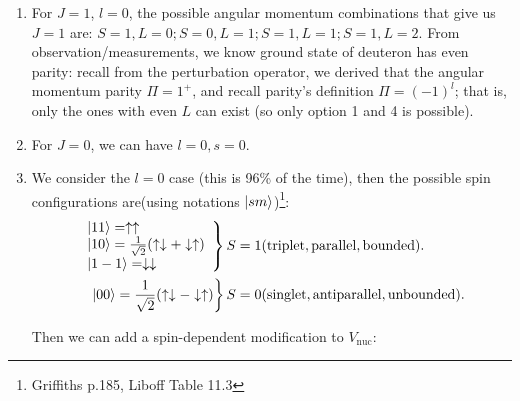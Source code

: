 \documentclass{school-22.101-notes}
\begin{document}
\begin{enumerate}
\item For $J=1$, $l=0$, the possible angular momentum combinations that give us $J=1$ are: $S=1, L=0; S=0, L=1; S=1, L=1; S=1, L=2$. From observation/measurements, we know ground state of deuteron has even parity: recall from the perturbation operator, we derived that the angular momentum parity $\Pi = 1^+$,  and recall parity's definition $\Pi = (-1)^l$; that is, only the ones with even $L$ can exist (so only option 1 and 4 is possible).

\item For $J=0$, we can have $l=0, s=0$. 

\item We consider the $l=0$ case (this is 96\% of the time), then the possible spin configurations are(using notations $\left| s m \right>$)\footnote{Griffiths p.185, Liboff Table 11.3}: 
\begin{align}
\left. \begin{array}{l} 
\left| 1 1 \right> = \uparrow \uparrow \\
\left| 1 0 \right> = \frac{1}{\sqrt{2}} (\uparrow \downarrow + \downarrow \uparrow ) \\
\left| 1 -1 \right> = \downarrow \downarrow
\end{array} \right\}
S &= 1  (\mathrm{triplet, parallel, bounded}). \\
\left. \left| 0 0 \right> = \frac{1}{\sqrt{2}} (\uparrow \downarrow - \downarrow \uparrow ) \right\} 
S &= 0  (\mathrm{singlet, antiparallel, unbounded}).
\end{align}

Then we can add a spin-dependent modification to $V_{\mathrm{nuc}}$:


\end{enumerate}
\end{document}
